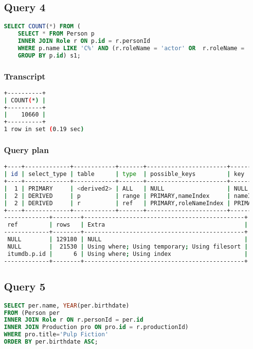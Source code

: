 \bigskip
\subsection{Query 4}
\begin{lstlisting}[language=sql]
SELECT COUNT(*) FROM (
	SELECT * FROM Person p
	INNER JOIN Role r ON p.id = r.personId
	WHERE p.name LIKE 'C%' AND (r.roleName = 'actor' OR  r.roleName = 'director')
	GROUP BY p.id) s1;
\end{lstlisting}
\subsubsection{Transcript}
\begin{lstlisting}[language=bash]
+----------+
| COUNT(*) |
+----------+
|    10660 |
+----------+
1 row in set (0.19 sec)
\end{lstlisting}

\subsubsection{Query plan}
\begin{lstlisting}[language=bash]
+----+-------------+------------+-------+-----------------------+-----------+---------+
| id | select_type | table      | type  | possible_keys         | key       | key_len |
+----+-------------+------------+-------+-----------------------+-----------+---------+
|  1 | PRIMARY     | <derived2> | ALL   | NULL                  | NULL      | NULL    |
|  2 | DERIVED     | p          | range | PRIMARY,nameIndex     | nameIndex | 32      |
|  2 | DERIVED     | r          | ref   | PRIMARY,roleNameIndex | PRIMARY   | 4       |
+----+-------------+------------+-------+-----------------------+-----------+---------+
-------------+--------+----------------------------------------------+
 ref         | rows   | Extra                                        |
-------------+--------+----------------------------------------------+
 NULL        | 129180 | NULL                                         |
 NULL        |  21530 | Using where; Using temporary; Using filesort |
 itumdb.p.id |      6 | Using where; Using index                     |
-------------+--------+----------------------------------------------+
\end{lstlisting}


\bigskip
\subsection{Query 5}
\begin{lstlisting}[language=sql]
SELECT per.name, YEAR(per.birthdate)
FROM (Person per
INNER JOIN Role r ON r.personId = per.id
INNER JOIN Production pro ON pro.id = r.productionId)
WHERE pro.title='Pulp Fiction'
ORDER BY per.birthdate ASC;
\end{lstlisting}


